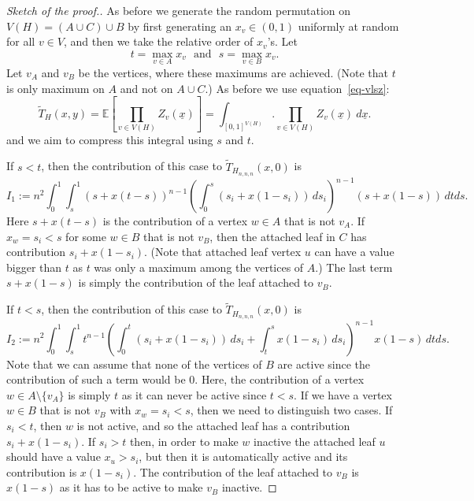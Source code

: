 \documentclass[10pt,a4paper]{amsart}
\newcommand{\wT}{\widetilde{T}}
\begin{document}
\begin{proof}[Sketch of the proof.]
As before we generate the random permutation on \\ $V(H)=(A\cup C)\cup B$ by first generating an $x_v\in (0,1)$ uniformly at random for all $v\in V$, and then we take the relative order of $x_v$'s. Let
$$t=\max_{v\in A}x_v\ \ \ \text{and}\ \ \ s=\max_{v\in B}x_v.$$
Let $v_A$ and $v_B$ be the vertices, where these maximums are achieved.
(Note that $t$ is only maximum on $A$ and not on $A\cup C$.) As before we use equation~\ref{eq-vlsz}:
\begin{equation*} 
\wT_H(x,y)=\mathbb{E}\left[\prod_{v\in V(H)}Z_v(\underline{x})\right]=\int_{[0,1]^{V(H)}}.\prod_{v\in V(H)}Z_v(\underline{x})\ d\underline{x}.
\end{equation*}
and we aim to compress this integral using $s$ and $t$.

If $s<t$, then the contribution of this case to $\wT_{H_{n,n,n}}(x,0)$ is
\begin{equation} \label{int1}
I_1:=n^2\int_0^1\int_s^1(s+x(t-s))^{n-1}\left(\int_{0}^s(s_i+x(1-s_i))\, ds_i\right)^{n-1}(s+x(1-s))\, dt ds.
\end{equation}
Here $s+x(t-s)$ is the contribution of a vertex $w\in A$ that is not $v_A$. If $x_w=s_i<s$ for some $w\in B$ that is not $v_B$, then the attached leaf in $C$ has contribution $s_i+x(1-s_i)$. (Note that attached leaf vertex $u$ can have a value bigger than $t$ as $t$ was only a maximum among the vertices of $A$.) The last term $s+x(1-s)$ is simply the contribution of the leaf attached to $v_B$. 

If $t<s$, then the contribution of this case to $\wT_{H_{n,n,n}}(x,0)$ is
\begin{equation} \label{int2}
I_2:=n^2\int_0^1\int_s^1t^{n-1}\left(\int_{0}^t(s_i+x(1-s_i))\, ds_i+\int_{t}^sx(1-s_i)\, ds_i\right)^{n-1}x(1-s)\, dtds.
\end{equation} 
Note that we can assume that none of the vertices of $B$ are active since the contribution of such a term would be $0$.
Here, the contribution of a vertex $w\in A\setminus \{v_A\}$ is simply $t$ as it can never be active since $t<s$. If we have a vertex $w\in B$ that is not $v_B$ with $x_w=s_i<s$, then we need to distinguish two cases. If $s_i<t$, then $w$ is not active, and so the attached leaf has a contribution $s_i+x(1-s_i)$. If $s_i>t$ then, in order to make $w$ inactive the attached leaf $u$ should have a value $x_u>s_i$, but then it is automatically active and its contribution is $x(1-s_i)$. The contribution of the leaf attached to $v_B$ is $x(1-s)$ as it has to be active to make $v_B$ inactive.


\end{proof}
\end{document}
